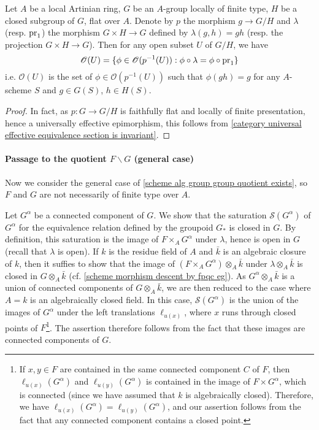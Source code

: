 \begin{corollary}\label{scheme A-group quotient by subgroup section is invariant}
Let $A$ be a local Artinian ring, $G$ be an $A$-group locally of finite type, $H$ be a closed subgroup of $G$, flat over $A$. Denote by $p$ the morphism $g\to G/H$ and $\lambda$ (resp. $\mathrm{pr}_1$) the morphism $G\times H\to G$ defined by $\lambda(g,h)=gh$ (resp. the projection $G\times H\to G$). Then for any open subset $U$ of $G/H$, we have
\[\mathscr{O}(U)=\{\phi\in\mathscr{O}(p^{-1}(U)):\phi\circ\lambda=\phi\circ\mathrm{pr}_1\}\]
i.e. $\mathscr{O}(U)$ is the set of $\phi\in\mathscr{O}(p^{-1}(U))$ such that $\phi(gh)=g$ for any $A$-scheme $S$ and $g\in G(S)$, $h\in H(S)$.
\end{corollary}
\begin{proof}
In fact, as $p:G\to G/H$ is faithfully flat and locally of finite presentation, hence a universally effective epimorphism, this follows from \cref{category universal effective equivalence section is invariant}.
\end{proof}

\paragraph{Passage to the quotient \texorpdfstring{$F\backslash G$}{FG} (general case)}\label{scheme alg group group quotient general case paragraph}

Now we consider the general case of \cref{scheme alg group group quotient exists}, so $F$ and $G$ are not necessarily of finite type over $A$.\par
Let $G^\alpha$ be a connected component of $G$. We show that the saturation $\mathcal{S}(G^\alpha)$ of $G^\alpha$ for the equivalence relation defined by the groupoid $G_*$ is closed in $G$. By definition, this saturation is the image of $F\times_AG^\alpha$ under $\lambda$, hence is open in $G$ (recall that $\lambda$ is open). If $k$ is the residue field of $A$ and $\bar{k}$ is an algebraic closure of $k$, then it suffies to show that the image of $(F\times_AG^\alpha)\otimes_A\bar{k}$ under $\lambda\otimes_A\bar{k}$ is closed in $G\otimes_A\bar{k}$ (cf. \cref{scheme morphism descent by fpqc eg}). As $G^\alpha\otimes_A\bar{k}$ is a union of connected components of $G\otimes_A\bar{k}$, we are then reduced to the case where $A=k$ is an algebraically closed field. In this case, $\mathcal{S}(G^\alpha)$ is the union of the images of $G^\alpha$ under the left translations $\ell_{u(x)}$, where $x$ runs through closed points of $F$\footnote{If $x,y\in F$ are contained in the same connected component $C$ of $F$, then $\ell_{u(x)}(G^\alpha)$ and $\ell_{u(y)}(G^\alpha)$ is contained in the image of $F\times G^\alpha$, which is connected (since we have assumed that $k$ is algebraically closed). Therefore, we have $\ell_{u(x)}(G^\alpha)=\ell_{u(y)}(G^\alpha)$, and our assertion follows from the fact that any connected component contains a closed point.}. The assertion therefore follows from the fact that these images are connected components of $G$.\par


